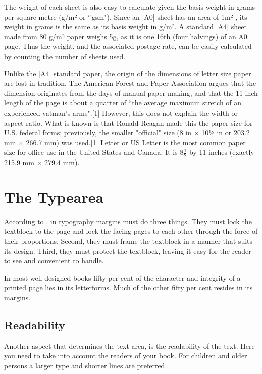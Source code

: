 

The weight of each sheet is also easy to calculate given the basis weight in grams per square metre (g/m² or `'gsm"). Since an |A0| sheet has an area of 1m² , its weight in grams is the same as its basis weight in g/m². A standard |A4| sheet made from 80 g/m² paper weighs 5g, as it is one 16th (four halvings) of an A0 page. Thus the weight, and the associated postage rate, can be easily calculated by counting the number of sheets used.

Unlike the |A4| standard paper, the origin of the dimensions of letter size paper are lost in tradition. The American Forest and Paper Association argues that the dimension originates from the days of manual paper making, and that the 11-inch length of the page is about a quarter of ``the average maximum stretch of an experienced vatman's arms".[1] However, this does not explain the width or aspect ratio. What is known is that Ronald Reagan made this the paper size for U.S. federal forms; previously, the smaller "official" size (8 in × 10½ in or 203.2 mm × 266.7 mm) was used.[1] Letter or US Letter is the most common paper size for office use in the United States and Canada. It is 8$\frac{1}{2}$ by 11 inches (exactly 215.9 mm × 279.4 mm).

\section{The Typearea}

According to \cite{bringhurst2005}, in typography margins must do three things. They must lock the
textblock to the page and lock the facing pages to each other through the force of their proportions. Second, they must frame the textblock in a manner that suits its design. Third, they must protect the textblock, leaving it easy for the reader to see and convenient to handle. 

In most well designed books fifty per cent of the character and integrity of a printed page lies in its letterforms. Much of the other fifty per cent resides in its margins.


\subsection{Readability}

Another aspect that determines the text area, is the readability of the text. Here you need to take into account the readers of your book. For children and older persons a larger type and shorter lines are preferred.

